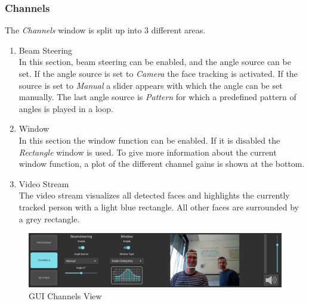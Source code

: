 \subsubsection{Channels}
The \textit{Channels} window is split up into 3 different areas.
\begin{enumerate}
    \item Beam Steering \\
    In this section, beam steering can be enabled, and the angle source can be set. If the angle source is set to \textit{Camera} the face tracking is activated. If the source is set to \textit{Manual} a slider appears with which the angle can be set manually. The last angle source is \textit{Pattern} for which a predefined pattern of angles is played in a loop. 
    \item Window \\
    In this section the window function can be enabled. If it is disabled the \textit{Rectangle} window is used. To give more information about the current window function, a plot of the different channel gains is shown at the bottom.
    \item Video Stream \\
    The video stream visualizes all detected faces and highlights the currently tracked person with a light blue rectangle. All other faces are surrounded by a grey rectangle.
\end{enumerate}
\begin{figure}[h!]
    \centering
    \includegraphics[width=\textwidth]{images/4_Design/Software/Page_Channels_Camera.png}
    \caption{GUI Channels View}
    \label{4_fig:gui_channels}
\end{figure}
